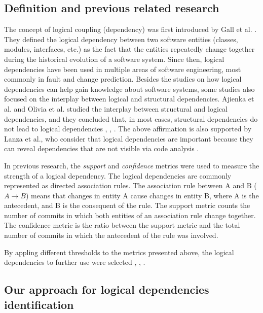 \documentclass[runningheads]{comsis2}
\begin{document}
\subsection{Definition and previous related research}
\label{definition_ld}
The concept of logical coupling (dependency) was first introduced by Gall et al. \cite{Gall:1998:DLC:850947.853338}. They defined the logical dependency between two software entities (classes, modules, interfaces, etc.) as the fact that the entities repeatedly change together during the historical evolution of a software system.
Since then, logical dependencies have been used in multiple areas of software engineering, most commonly in fault and change prediction.  
Besides the studies on how logical dependencies can help gain knowledge about software systems, some studies also focused on the interplay between logical and structural dependencies. Ajienka et al. and Olivia et al. studied the interplay between structural and logical dependencies, and they concluded that, in most cases, structural dependencies do not lead to logical dependencies \cite{Oliva:2011:ISL:2067853.2068086}, \cite{DBLP:conf/issre/OlivaG15}, \cite{DBLP:journals/jss/AjienkaC17}. The above affirmation is also supported by Lanza et al., who consider that logical dependencies are important because they can reveal dependencies that are not visible via code analysis \cite{inproceedings_radar_evolution}.



In previous research, the \textit{support} and \textit{confidence} metrics were used to measure the strength of a logical dependency. 
The logical dependencies are commonly represented as directed association rules. The association rule between A and B ( $A \rightarrow B$) means that changes in entity A cause changes in entity B, where A is the antecedent, and B is the consequent of the rule. 
The support metric counts the number of commits in which both entities of an association rule change together. The confidence metric is the ratio between the support metric and the total number of commits in which the antecedent of the rule was involved. 

By appling different thresholds to the metrics presented above, the logical dependencies to further use were selected \cite{DBLP:conf/issre/OlivaG15}, \cite{DBLP:journals/jss/AjienkaC17}, \cite{Zimmermann:2004:MVH:998675.999460}.


\subsection{Our approach for logical dependencies identification}
\label{current_approach}
\end{document}
